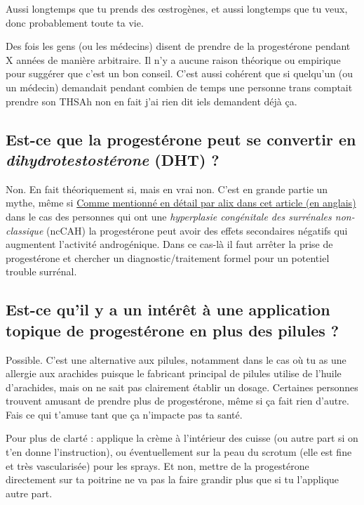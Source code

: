 \documentclass{article}
\begin{document}
Aussi longtemps que tu prends des œstrogènes, et aussi longtemps que tu veux, donc probablement toute ta vie.

Des fois les gens (ou les médecins) disent de prendre de la progestérone pendant X années de manière arbitraire. Il n'y a aucune raison théorique ou empirique pour suggérer que c'est un bon conseil. C'est aussi cohérent que si quelqu'un (ou un médecin) demandait pendant combien de temps une personne trans comptait prendre son THS\textemdash{}Ah non en fait j'ai rien dit iels demandent déjà ça.

\subsection{Est-ce que la progestérone peut se convertir en \textit{dihydrotestostérone} (DHT) ?}

Non. En fait théoriquement si, mais en vrai non. C'est en grande partie un mythe, même si \href{https://whsah.co/posts/rethinking-progesterone-and-androgens/}{Comme mentionné en détail par alix dans cet article (en anglais)} dans le cas des personnes qui ont une \textit{hyperplasie congénitale des surrénales non-classique} (ncCAH) la progestérone peut avoir des effets secondaires négatifs qui augmentent l'activité androgénique. Dans ce cas-là il faut arrêter la prise de progestérone et chercher un diagnostic/traitement formel pour un potentiel trouble surrénal.

\subsection{Est-ce qu'il y a un intérêt à une application topique de progestérone en plus des pilules ?}

Possible. C'est une alternative aux pilules, notamment dans le cas où tu as une allergie aux arachides puisque le fabricant principal de pilules utilise de l'huile d'arachides, mais on ne sait pas clairement établir un dosage. Certaines personnes trouvent amusant de prendre plus de progestérone, même si ça fait rien d'autre. Fais ce qui t'amuse tant que ça n'impacte pas ta santé.

Pour plus de clarté : applique la crème à l'intérieur des cuisse (ou autre part si on t'en donne l'instruction), ou éventuellement sur la peau du scrotum (elle est fine et très vascularisée) pour les sprays. Et non, mettre de la progestérone directement sur ta poitrine ne va pas la faire grandir plus que si tu l'applique autre part.
\end{document}
